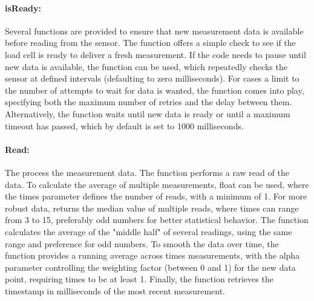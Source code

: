 \paragraph{isReady:}
Several functions are provided to ensure that new measurement data is available before reading from the sensor. The  function offers a simple check to see if the load cell is ready to deliver a fresh measurement. If the code needs to pause until new data is available, the  function can be used, which repeatedly checks the sensor at defined intervals (defaulting to zero milliseconds). For cases a limit to the number of attempts to wait for data is wanted, the  function comes into play, specifying both the maximum number of retries and the delay between them. Alternatively, the  function waits until new data is ready or until a maximum timeout has passed, which by default is set to 1000 milliseconds.

\paragraph{Read:}
The  process the measurement data. The  function performs a raw read of the data. To calculate the average of multiple measurements, float  can be used, where the times parameter defines the number of reads, with a minimum of 1. For more robust data,  returns the median value of multiple reads, where times can range from 3 to 15, preferably odd numbers for better statistical behavior. The  function calculates the average of the "middle half" of several readings, using the same range and preference for odd numbers. To smooth the data over time, the  function provides a running average across times measurements, with the alpha parameter controlling the weighting factor (between 0 and 1) for the new data point, requiring times to be at least 1. Finally, the  function retrieves the timestamp in milliseconds of the most recent measurement.

